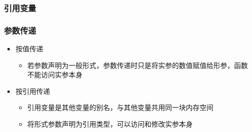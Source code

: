 \begin{frame}[fragile]
    \frametitle{引用变量}

\end{frame}

\begin{frame}[fragile]
    \frametitle{参数传递}

        \begin{itemize}
            \item 按值传递

            \begin{itemize}
                \item 若参数声明为一般形式，参数传递时只是将实参的数值赋值给形参，函数不能访问实参本身
            \end{itemize}
            
            \item 按引用传递

            \begin{itemize}
                \item 引用变量是其他变量的别名，与其他变量共用同一块内存空间
                \item 将形式参数声明为引用类型，可以访问和修改实参本身
            \end{itemize}
            
        \end{itemize}
    
\end{frame}



